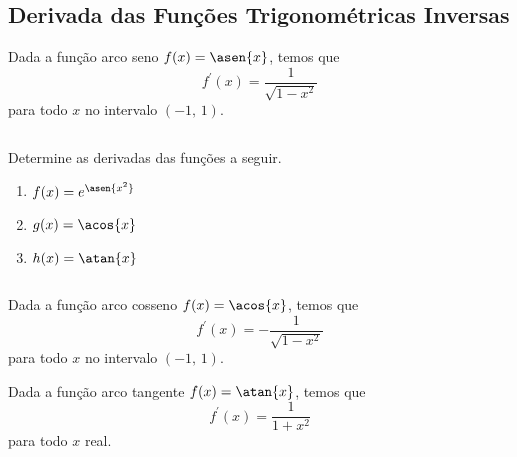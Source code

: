 \subsection{Derivada das Funções Trigonométricas Inversas}
\begin{frame}
  \begin{theorem}
    Dada a função arco seno $f(x) = \asen{x}$, temos que 
    \begin{equation*}
      f^{\prime}(x) = \frac{1}{\sqrt{1-x^{2}}}
    \end{equation*}
    para todo $x$ no intervalo $(-1,\,1)$.
  \end{theorem}
  \begin{columns}[onlytextwidth]
    \begin{column}{0.55\textwidth}
      \begin{example-highlight}
        Determine as derivadas das funções a seguir.
        \begin{enumerate}
          \item $f(x) = e^{\asen{x^{2}}}$
          \item $g(x) = \acos{x}$
          \item $h(x) = \atan{x}$
        \end{enumerate}
      \end{example-highlight}
    \end{column}
    \begin{column}{0.43\textwidth}
    \end{column}
  \end{columns}
\end{frame}

\begin{frame}
  \begin{theorem}
    Dada a função arco cosseno $f(x) = \acos{x}$, temos que 
    \begin{equation*}
      f^{\prime}(x) = -\frac{1}{\sqrt{1-x^{2}}}
    \end{equation*}
    para todo $x$ no intervalo $(-1,\,1)$.
  \end{theorem}
  \vfill
  \begin{theorem}
    Dada a função arco tangente $f(x) = \atan{x}$, temos que 
    \begin{equation*}
      f^{\prime}(x) = \frac{1}{1+x^{2}}
    \end{equation*}
    para todo $x$ real.
  \end{theorem}
\end{frame}

